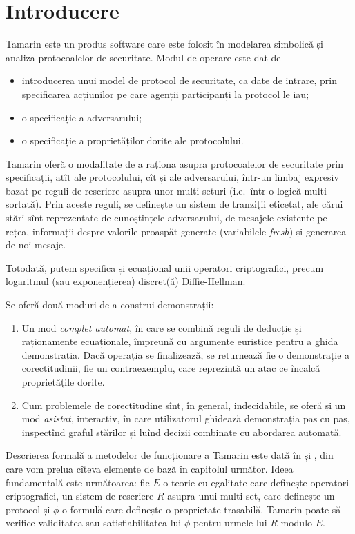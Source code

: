 
\chapter{Introducere}

Tamarin este un produs software care este folosit în modelarea simbolică
și analiza protocoalelor de securitate. Modul de operare este dat de
\begin{itemize}
    \item introducerea unui model de protocol de securitate, ca date de intrare,
        prin specificarea acțiunilor pe care agenții participanți la protocol
        le iau;
    \item o specificație a adversarului;
    \item o specificație a proprietăților dorite ale protocolului.
\end{itemize}

Tamarin oferă o modalitate de a raționa asupra protocoalelor de securitate
prin specificații, atît ale protocolului, cît și ale adversarului, într-un
limbaj expresiv bazat pe reguli de rescriere asupra unor multi-seturi
(i.e.\ într-o logică multi-sortată). Prin aceste reguli, se definește un
sistem de tranziții eticetat, ale cărui stări sînt reprezentate de
cunoștințele adversarului, de mesajele existente pe rețea, informații
despre valorile proaspăt generate (variabilele \emph{fresh}) și
generarea de noi mesaje.

Totodată, putem specifica și ecuațional unii operatori criptografici,
precum logaritmul (sau exponențierea) discret(ă) Diffie-Hellman.

Se oferă două moduri de a construi demonstrații:
\begin{enumerate}[(1)]
    \item Un mod \emph{complet automat}, în care se combină reguli
        de deducție și raționamente ecuaționale, împreună cu argumente
        euristice pentru a ghida demonstrația. Dacă operația se finalizează,
        se returnează fie o demonstrație a corectitudinii, fie un
        contraexemplu, care reprezintă un atac ce încalcă proprietățile
        dorite.
    \item Cum problemele de corectitudine sînt, în general, indecidabile,
        se oferă și un mod \emph{asistat}, interactiv, în care utilizatorul
        ghidează demonstrația pas cu pas, inspectînd graful stărilor și
        luînd decizii combinate cu abordarea automată.
\end{enumerate}

Descrierea formală a metodelor de funcționare a Tamarin este dată
în \cite{schmidt} și \cite{meier}, din care vom prelua cîteva elemente
de bază în capitolul următor. Ideea fundamentală este următoarea:
fie $ E $ o teorie cu egalitate care definește operatori criptografici,
un sistem de rescriere $ R $ asupra unui multi-set, care definește un
protocol și $ \phi $ o formulă care definește o proprietate trasabilă.
Tamarin poate să verifice validitatea sau satisfiabilitatea lui $ \phi $
pentru urmele lui $ R $ modulo $ E $.

